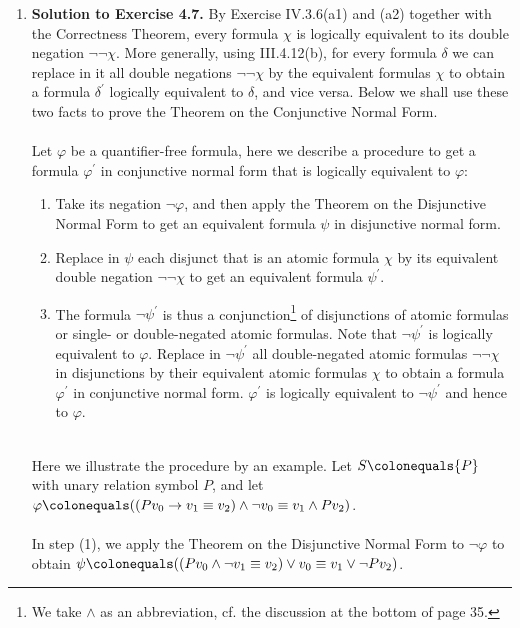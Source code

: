 \begin{enumerate}[1.]
%
\item \textbf{Solution to Exercise 4.7.} By Exercise IV.3.6(a1) and (a2) together with the Correctness Theorem, every formula $\chi$ is logically equivalent to its double negation $\neg\neg\chi$. More generally, using III.4.12(b), for every formula $\delta$ we can replace in it all double negations $\neg\neg\chi$ by the equivalent formulas $\chi$ to obtain a formula $\delta^\prime$ logically equivalent to $\delta$, and vice versa. Below we shall use these two facts to prove the Theorem on the Conjunctive Normal Form.\\
\ \\
Let $\varphi$ be a quantifier-free formula, here we describe a procedure to get a formula $\varphi^\prime$ in conjunctive normal form that is logically equivalent to $\varphi$:
\begin{enumerate}[(1)]
\item Take its negation $\neg\varphi$, and then apply the Theorem on the Disjunctive Normal Form to get an equivalent formula $\psi$ in disjunctive normal form.
\item Replace in $\psi$ each disjunct that is an atomic formula $\chi$ by its equivalent double negation $\neg\neg\chi$ to get an equivalent formula $\psi^\prime$.
\item The formula $\neg\psi^\prime$ is thus a conjunction\footnote{We take $\land$ as an abbreviation, cf. the discussion at the bottom of page 35.} of disjunctions of atomic formulas or single- or double-negated atomic formulas. Note that $\neg\psi^\prime$ is logically equivalent to $\varphi$. Replace in $\neg\psi^\prime$ all double-negated atomic formulas $\neg\neg\chi$ in disjunctions by their equivalent atomic formulas $\chi$ to obtain a formula $\varphi^\prime$ in conjunctive normal form. $\varphi^\prime$ is logically equivalent to $\neg\psi^\prime$ and hence to $\varphi$.
\end{enumerate}
\ \\
Here we illustrate the procedure by an example. Let $S \colonequals \{ P \}$ with unary relation symbol $P$, and let $\varphi \colonequals ((Pv_0 \rightarrow v_1 \equiv v_2) \land \neg v_0 \equiv v_1 \land Pv_2)$.\\
\ \\
In step (1), we apply the Theorem on the Disjunctive Normal Form to $\neg\varphi$ to obtain $\psi \colonequals ((Pv_0 \land \neg v_1 \equiv v_2) \lor v_0 \equiv v_1 \lor \neg Pv_2)$.\\

\end{enumerate}
